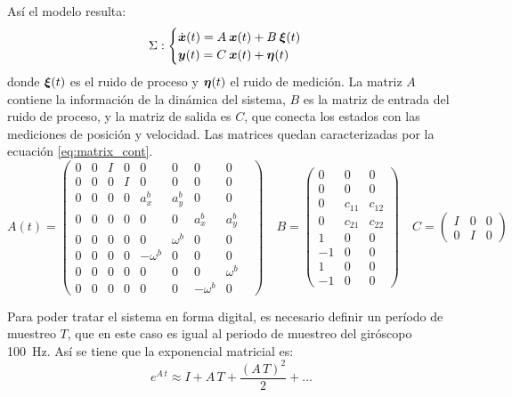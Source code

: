 	Así el modelo resulta:
		\begin{equation*}
			\Sigma:
			\begin{cases}
				\dot{\boldsymbol{x}}(t) = A\: \boldsymbol{x}(t) + B \: \boldsymbol{\xi}(t) \\
				\boldsymbol{y}(t) = C\: \boldsymbol{x}(t) + \boldsymbol{\eta}(t)
			\end{cases}
		\end{equation*}
	donde $\boldsymbol{\xi}(t)$ es el ruido de proceso y $\boldsymbol{\eta}(t)$ el ruido de medición. La matriz $A$ contiene la información de la dinámica del sistema, $B$ es la matriz de entrada del ruido de proceso, y la matriz de salida es $C$, que conecta los estados con las mediciones de posición y velocidad. Las matrices quedan caracterizadas por la ecuación \eqref{eq:matrix_cont}.
		\begin{equation}
			\label{eq:matrix_cont}
			A(t) = \begin{pmatrix}0&0&I&0&0&0&0&0\\[0.3em]0&0&0&I&0&0&0&0\\[0.3em]0&0&0&0&a^b_x&a^b_y&0&0\\[0.3em]0&0&0&0&0&0&a^b_x&a^b_y&\\[0.3em]0&0&0&0&0&\omega^b&0&0\\[0.3em]0&0&0&0&-\omega^b&0&0&0\\[0.3em]0&0&0&0&0&0&0&\omega^b\\[0.3em]0&0&0&0&0&0&-\omega^b&0\end{pmatrix} \quad%
			B = \begin{pmatrix}0&0&0\\[0.3em]0&0&0\\[0.3em]0&c_{11}&c_{12}\\[0.3em]0&c_{21}&c_{22}\\[0.3em]1&0&0\\[0.3em]-1&0&0\\[0.3em]1&0&0\\[0.3em]-1&0&0\end{pmatrix} \quad%
			C = \begin{pmatrix}I&0&0\\[0.3em]0&I&0\end{pmatrix}
		\end{equation}
	
	Para poder tratar el sistema en forma digital, es necesario definir un período de muestreo $T$, que en este caso es igual al periodo de muestreo del giróscopo \SI{100}{\Hz}. Así se tiene que la exponencial matricial es:
		\begin{equation*}
			e^{A\,t} \approx I + A\,T + \frac{(A\,T)^2}{2} + \hdots
		\end{equation*}


